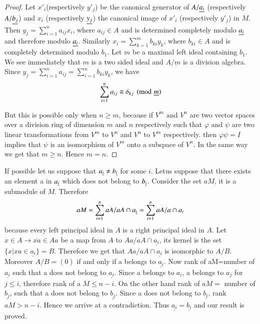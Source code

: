\begin{proof}
  Let $x'_i$(respectively $y'_j$) be the canonical generator of $ A /
  \underline{a_i}$ (respectively $A/ \underline{b_j}$) and
  $x_i$ (respectively $\underline{y_j}$) the canonical image of
  $x'_i$ (respectively $y'_j$) in $M$. Then $y_j = \sum \limits^n_{i=1}
  a_{ij}x_i$, where $a_{ij} \in A$ and is determined completely modulo
  $\underline{a_i}$ and therefore modulo
  $\underline{a_i}$. Similarly $x_i=\sum\limits^m_{k=1} b_{ki}y_k$,
  where $b_{ki} \in A$ and is completely determined modulo $b_1$. Let $m$ be
  a maximal left ideal containing $b_1$. We see immediately that $m$ is
  a two sided ideal and $A/ \underbar{m}$  is a division
  algebra. Since $y_j = \sum \limits^n_{i=1} a_{ij} = \sum
  \limits^n_{i=1} b_{ki}y_k$, we have  
  $$
  \sum^n_{i=1} a_{ij} \equiv \delta_{kj} \pmod{\underline{m}} 
  $$

  But this is possible only when $n \geq m$, because if $V^m \text{ and
  } V^n$ are two vector spaces over a division ring of dimension $m$ and $n$
  respectively such that $\varphi \text{ and }\psi$ are two linear
  transformations from $V^m \text{ to } V^n$ and $V^n \text{ to } V^m$
  respectively. then $\varphi \psi = I$ implies that $\psi$ is an
  isomorphism of $V^m$ onto a subspace of $V^n$. In the same way we get
  that $m \geq n$. Hence $m=n$. 
\end{proof}

If possible let us suppose that $a_{\underline{i}} \neq b_{\underline{i}}$ for some $i$.
Let\pageoriginale us suppose that there exists an element a in $a_{\underline{i}}$
which does not belong to $b_{\underline{i}}$. Consider the set $aM$, it is
a submodule of $M$. Therefore 
$$
a M = \sum^n_{i=1} a A/ a A \cap a_{\underline{i}}=\sum ^n_{i=1} a A/ a
\cap a_i 
$$
because every left principal ideal in $A$ is a right principal ideal
in $A$. Let $x \in A \to \overline{xa} \in Aa$ be a map from $A$ to $Aa/
a A \cap \underline{a_{i}}$, its kernel is the set $\{x|xa \in
\underline{a_{i}}\}=B$. Therefore we get that $Aa/a A \cap
\underline{a_{i}}$ is isomorphic to $A/B$. Moreover $A/B = (0)$ if and
only if a belongs to $\underline{a_{i}}$. Now rank of aM=number of
$\underline{a_{i}}$ such that a does not belong to
$\underline{a_{i}}$. Since a belongs to $a_{i}$, a belongs
to ${a_{j}}$  for $j \leq i$, therefore rank of a $M \leq
n-i$. On the other hand rank of $a M =$ number of
$\underline{b_{j}}$, such that a does not belong to
$\underline{b_{j}}$. Since a does not belong to $\underline{b_{i}}$,
rank $a M> n-i$. Hence we arrive at a contradiction. Thus
$\underline{a_{i}} = \underline{b_{i}}$ and our result is proved.  

